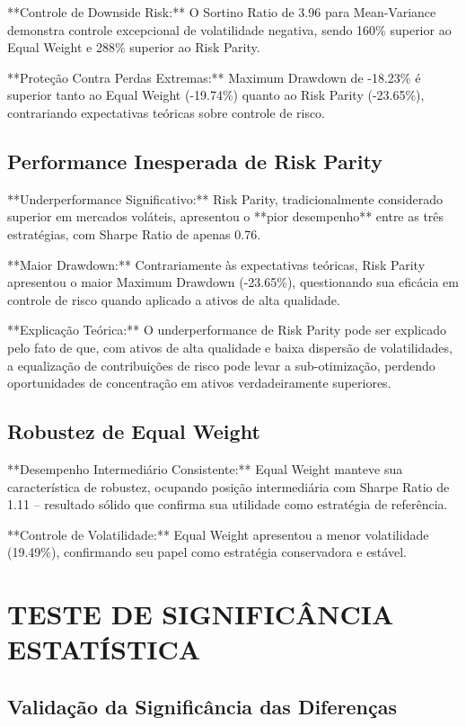 **Controle de Downside Risk:** O Sortino Ratio de 3.96 para Mean-Variance demonstra controle excepcional de volatilidade negativa, sendo 160\% superior ao Equal Weight e 288\% superior ao Risk Parity.

**Proteção Contra Perdas Extremas:** Maximum Drawdown de -18.23\% é superior tanto ao Equal Weight (-19.74\%) quanto ao Risk Parity (-23.65\%), contrariando expectativas teóricas sobre controle de risco.

\subsection{Performance Inesperada de Risk Parity}

**Underperformance Significativo:** Risk Parity, tradicionalmente considerado superior em mercados voláteis, apresentou o **pior desempenho** entre as três estratégias, com Sharpe Ratio de apenas 0.76.

**Maior Drawdown:** Contrariamente às expectativas teóricas, Risk Parity apresentou o maior Maximum Drawdown (-23.65\%), questionando sua eficácia em controle de risco quando aplicado a ativos de alta qualidade.

**Explicação Teórica:** O underperformance de Risk Parity pode ser explicado pelo fato de que, com ativos de alta qualidade e baixa dispersão de volatilidades, a equalização de contribuições de risco pode levar a sub-otimização, perdendo oportunidades de concentração em ativos verdadeiramente superiores.

\subsection{Robustez de Equal Weight}

**Desempenho Intermediário Consistente:** Equal Weight manteve sua característica de robustez, ocupando posição intermediária com Sharpe Ratio de 1.11 – resultado sólido que confirma sua utilidade como estratégia de referência.

**Controle de Volatilidade:** Equal Weight apresentou a menor volatilidade (19.49\%), confirmando seu papel como estratégia conservadora e estável.

\section{TESTE DE SIGNIFICÂNCIA ESTATÍSTICA}

\subsection{Validação da Significância das Diferenças}

